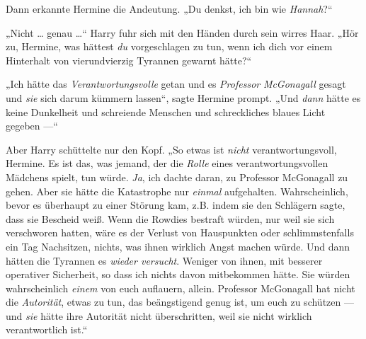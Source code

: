 Dann erkannte Hermine die Andeutung.
„Du denkst, ich bin wie \emph{Hannah}?“

„Nicht … genau …“ Harry fuhr sich mit den Händen durch sein wirres Haar.
„Hör zu, Hermine, was hättest \emph{du} vorgeschlagen zu tun, wenn ich dich vor einem Hinterhalt von vierundvierzig Tyrannen gewarnt hätte?“

„Ich hätte das \emph{Verantwortungsvolle} getan und es \emph{Professor} \emph{McGonagall} gesagt und \emph{sie} sich darum kümmern lassen“, sagte Hermine prompt.
„Und \emph{dann} hätte es keine Dunkelheit und schreiende Menschen und schreckliches blaues Licht gegeben —“

Aber Harry schüttelte nur den Kopf.
„So etwas ist \emph{nicht} verantwortungsvoll, Hermine. Es ist das, was jemand, der die \emph{Rolle} eines verantwortungsvollen Mädchens spielt, tun würde. \emph{Ja}, ich dachte daran, zu Professor McGonagall zu gehen. Aber sie hätte die Katastrophe nur \emph{einmal} aufgehalten. Wahrscheinlich, bevor es überhaupt zu einer Störung kam, z.B. indem sie den Schlägern sagte, dass sie Bescheid weiß. Wenn die Rowdies bestraft würden, nur weil sie sich verschworen hatten, wäre es der Verlust von Hauspunkten oder schlimmstenfalls ein Tag Nachsitzen, nichts, was ihnen wirklich Angst machen würde. Und dann hätten die Tyrannen es \emph{wieder versucht}. Weniger von ihnen, mit besserer operativer Sicherheit, so dass ich nichts davon mitbekommen hätte. Sie würden wahrscheinlich \emph{einem} von euch auflauern, allein. Professor McGonagall hat nicht die \emph{Autorität}, etwas zu tun, das beängstigend genug ist, um euch zu schützen — und \emph{sie} hätte ihre Autorität nicht überschritten, weil sie nicht wirklich verantwortlich ist.“

